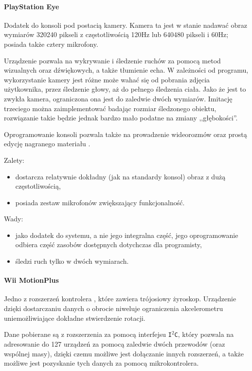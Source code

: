 \paragraph{PlayStation Eye}
Dodatek do konsoli  pod postacią kamery. Kamera ta jest w stanie nadawać obraz wymiarów 320\texttimes{}240 pikseli z częstotliwością 120Hz lub 640\texttimes{}480 pikseli i 60Hz; posiada także cztery mikrofony.

Urządzenie pozwala na wykrywanie i śledzenie ruchów za pomocą metod wizualnych oraz dźwiękowych, a także tłumienie echa. W zależności od programu, wykorzystanie kamery jest różne \ppauza może wahać się od pobrania zdjęcia użytkownika, przez śledzenie głowy, aż do pełnego śledzenia ciała. Jako że jest to zwykła kamera, ograniczona ona jest do zaledwie dwóch wymiarów. Imitację trzeciego można zaimplementować badając rozmiar śledzonego obiektu, rozwiązanie takie będzie jednak bardzo mało podatne na zmiany ,,głębokości''.

Oprogramowanie konsoli pozwala także na prowadzenie wideorozmów oraz prostą edycję nagranego materiału \citep{PSEye}.

Zalety:
\begin{itemize}
  \item dostarcza relatywnie dokładny (jak na standardy konsol) obraz z dużą częstotliwością,
  \item posiada zestaw mikrofonów zwiększający funkcjonalność.
\end{itemize}

Wady:
\begin{itemize}
  \item jako dodatek do systemu, a nie jego integralna część, jego oprogramowanie odbiera część zasobów dostępnych dotychczas dla programisty,
  \item śledzi ruch tylko w dwóch wymiarach.
\end{itemize}

\paragraph{Wii MotionPlus}
Jedno z rozszerzeń kontrolera , które zawiera trójosiowy żyroskop. Urządzenie dzięki dostarczaniu danych o obrocie niweluje ograniczenia akcelerometru uniemożliwiające dokładne stwierdzenie rotacji.

Dane pobierane są z rozszerzenia za pomocą interfejsu \texttt{I$^2$C}, który pozwala na adresowanie do 127 urządzeń za pomocą zaledwie dwóch przewodów (oraz wspólnej masy), dzięki czemu możliwe jest dołączanie innych rozszerzeń, a także możliwe jest pozyskanie tych danych za pomocą mikrokontrolera.

